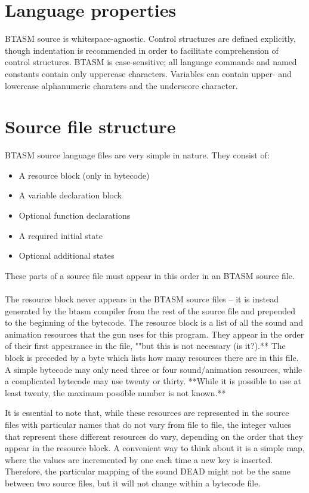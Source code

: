 \documentclass[12pt,a4paper]{scrbook}
\begin{document}
\section{Language properties}

BTASM source is whitespace-agnostic.  Control structures are defined explicitly, though indentation 
is
recommended in order to facilitate comprehension of control structures.  BTASM is case-sensitive;
all language commands and named constants contain only uppercase characters.  
Variables can contain upper- and lowercase alphanumeric charaters and the underscore character.

\section{Source file structure}
BTASM source language files are very simple in nature.  They consist of:
\begin{itemize}
\item A resource block (only in bytecode)
\item A variable declaration block
\item Optional function declarations
\item A required initial state
\item Optional additional states
\end{itemize}

These parts of a source file must appear in this order in an BTASM source file.  
\\\\
The resource block never appears in the BTASM source files -- it is instead generated by the btasm
compiler from
the rest of the source file and prepended to the beginning of the bytecode.  The resource block is 
a list of all the sound and animation resources that the gun uses for this program.  They appear in
the order of their first appearance in the file, ""but this is not necessary  (is it?).**  
The block is preceded by a byte which lists how many resources there are in this file.  A simple
bytecode may only need three or four sound/animation resources, while a complicated bytecode may use
twenty or thirty.  **While it is possible to use at least twenty, the maximum possible number is 
not known.**  

It is essential to note that, while these resources are represented in the source files with 
particular names that do not vary from file to file, the integer values that represent these 
different resources do vary, depending on the order that they appear in the resource block.  A 
convenient way to think about it is a simple map, where the values are incremented by one each time
a new key is inserted.  Therefore, the particular mapping of the sound DEAD might not be the same 
between two source files, but it will not change within a bytecode file.
\end{document}
